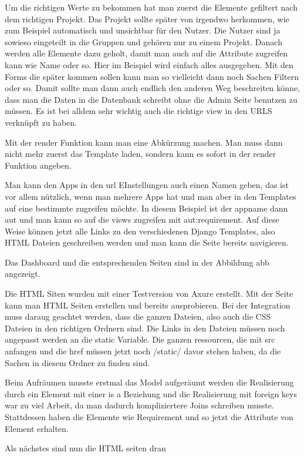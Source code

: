 \documentclass[11pt,a4paper]{report}
\begin{document}
Um die richtigen Werte zu bekommen hat man zuerst die Elemente gefiltert nach dem richtigen Projekt. Das Projekt sollte später von irgendwo herkommen, wie zum Beispiel automatisch und unsichtbar für den Nutzer. Die Nutzer sind ja sowieso eingeteilt in die Gruppen und gehören nur zu einem Projekt. Danach werden alle Elemente dazu geholt, damit man auch auf die Attribute zugreifen kann wie Name oder so. Hier im Beispiel wird einfach alles ausgegeben. Mit den Forms die später kommen sollen kann man so vielleicht dann noch Sachen Filtern oder so. Damit sollte man dann auch endlich den anderen Weg beschreiten könne, dass man die Daten in die Datenbank schreibt ohne die Admin Seite benutzen zu müssen. Es ist bei alldem sehr wichtig auch die richtige view in den URLS verknüpft zu haben. 

Mit der render Funktion kann man eine Abkürzung machen. Man muss dann nicht mehr zuerst das Template laden, sondern kann es sofort in der render Funktion angeben.

Man kann den Apps in den url EInstellungen auch einen Namen geben, das ist vor allem nützlich, wenn man mehrere Apps hat und man aber in den Templates auf eine bestimmte zugreifen möchte. In diesem Beispiel ist der appname dann aut und man kann so auf die views zugreifen mit aut:requirement. Auf diese Weise können jetzt alle Links zu den verschiedenen Django Templates, also HTML Dateien geschreiben werden und man kann die Seite bereits navigieren.

Das Dashboard und die entsprechenden Seiten sind in der Abbildung abb angezeigt.

Die HTML Siten wurden mit einer Testversion von Axure erstellt. Mit der Seite kann man HTML Seiten erstellen und bereits ausprobieren. Bei der Integration muss daraug geachtet werden, dass die ganzen Dateien, also auch die CSS Dateien in den richtigen Ordnern sind. Die Links in den Dateien müssen noch angepasst werden an die static Variable. Die ganzen ressourcen, die mit src anfangen und die href müssen jetzt noch /static/ davor stehen haben, da die Sachen in diesem Ordner zu finden sind.

Beim Aufräumen musste erstmal das Model aufgeräumt werden die Realisierung durch ein Element mit einer is a Beziehung und die Realisierung mit foreign keys war zu viel Arbeit, da man dadurch kompliziertere Joins schreiben musste. Stattdessen haben die Elemente wie Requirement und so jetzt die Attribute von Element erhalten.

Als nächstes sind nun die HTML seiten dran
\end{document}

